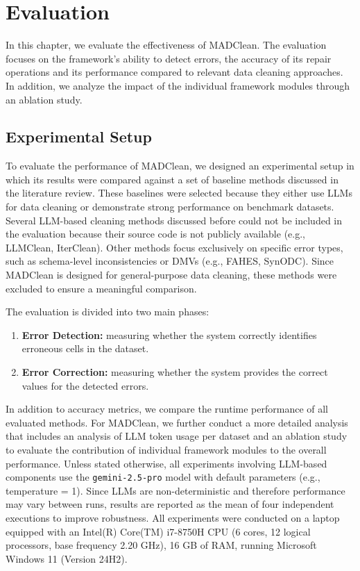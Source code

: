 \chapter{Evaluation}
In this chapter, we evaluate the effectiveness of MADClean.
The evaluation focuses on the framework's ability to detect errors, the accuracy of its repair operations and its performance compared to relevant data cleaning approaches.
In addition, we analyze the impact of the individual framework modules through an ablation study.
\section{Experimental Setup}
To evaluate the performance of MADClean, we designed an experimental setup in which its results were compared against a set of baseline methods discussed in the literature review. 
These baselines were selected because they either use LLMs for data cleaning or demonstrate strong performance on benchmark datasets.
Several LLM-based cleaning methods discussed before could not be included in the evaluation because their source code is not publicly available (e.g., LLMClean, IterClean).
Other methods focus exclusively on specific error types, such as schema-level inconsistencies or DMVs (e.g., FAHES, SynODC). 
Since MADClean is designed for general-purpose data cleaning, these methods were excluded to ensure a meaningful comparison.

The evaluation is divided into two main phases:
\begin{enumerate}
  \item \textbf{Error Detection:} measuring whether the system correctly identifies erroneous cells in the dataset.
  \item \textbf{Error Correction:} measuring whether the system provides the correct values for the detected errors.
\end{enumerate}

In addition to accuracy metrics, we compare the runtime performance of all evaluated methods. 
For MADClean, we further conduct a more detailed analysis that includes an analysis of LLM token usage per dataset and an ablation study to evaluate the contribution of individual framework modules to the overall performance.
\newline\newline
Unless stated otherwise, all experiments involving LLM-based components use the \texttt{gemini-2.5-pro} model with default parameters (e.g., temperature = 1). 
Since LLMs are non-deterministic and therefore performance may vary between runs, results are reported as the mean of four independent executions to improve robustness. 
All experiments were conducted on a laptop equipped with an Intel(R) Core(TM) i7-8750H CPU (6 cores, 12 logical processors, base frequency 2.20 GHz), 16 GB of RAM, running Microsoft Windows 11 (Version 24H2).

